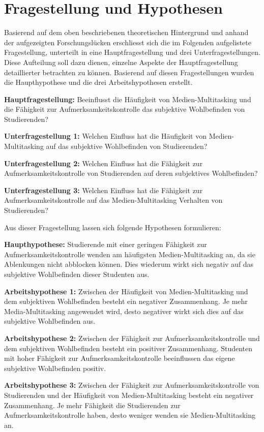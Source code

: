 \section{Fragestellung und Hypothesen}\label{section.fragestellung}
Basierend auf dem oben beschriebenen theoretischen Hintergrund und anhand der aufgezeigten Forschungslücken erschliesst sich die im Folgenden aufgelistete Fragestellung, unterteilt in eine Hauptfragestellung und drei Unterfragestellungen. Diese Aufteilung soll dazu dienen, einzelne Aspekte der Hauptfragestellung detaillierter betrachten zu können. Basierend auf diesen Fragestellungen wurden die Haupthypothese und die drei Arbeitshypothesen erstellt.  
\par
\textbf{Hauptfragestellung:} Beeinflusst die Häufigkeit von Medien-Multitasking und die Fähigkeit zur Aufmerksamkeitskontrolle das subjektive Wohlbefinden von Studierenden?
\par
\textbf{Unterfragestellung 1:} Welchen Einfluss hat die Häufigkeit von Medien-Multitasking auf das subjektive Wohlbefinden von Studierenden?
\par
\textbf{Unterfragestellung 2:} Welchen Einfluss hat die Fähigkeit zur Aufmerksamkeitskontrolle von Studierenden auf deren subjektives Wohlbefinden?
\par
\textbf{Unterfragestellung 3:} Welchen Einfluss hat die Fähigkeit zur Aufmerksamkeitskontrolle auf das Medien-Multitasking Verhalten von Studierenden?
\par
Aus dieser Fragestellung lassen sich folgende Hypothesen formulieren:
\par
\textbf{Haupthypothese:}
Studierende mit einer geringen Fähigkeit zur Aufmerksamkeitskontrolle wenden am häufigsten Medien-Multitasking an, da sie Ablenkungen nicht abblocken können. Dies wiederum wirkt sich negativ auf das subjektive Wohlbefinden dieser Studenten aus.
\par
\textbf{Arbeitshypothese 1:} Zwischen der Häufigkeit von Medien-Multitasking und dem subjektiven Wohlbefinden besteht ein negativer Zusammenhang. Je mehr Media-Multitasking angewendet wird, desto negativer wirkt sich dies auf das subjektive Wohlbefinden aus.
\par
\textbf{Arbeitshypothese 2:} Zwischen der Fähigkeit zur Aufmerksamkeitskontrolle und dem subjektiven Wohlbefinden besteht ein positiver Zusammenhang. Studenten mit hoher Fähigkeit zur Aufmerksamkeitskontrolle beeinflussen das eigene subjektive Wohlbefinden positiv.
\par
\textbf{Arbeitshypothese 3:} Zwischen der Fähigkeit zur Aufmerksamkeitskontrolle von Studierenden und der Häufigkeit von Medien-Multitasking besteht ein negativer Zusammenhang. Je mehr Fähigkeit die Studierenden zur Aufmerksamkeitskontrolle haben, desto weniger wenden sie Medien-Multitasking an.

